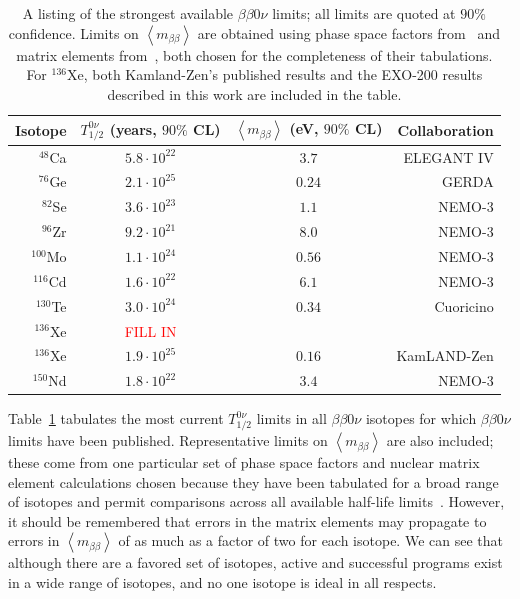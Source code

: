 \begin{table}
\begin{center}
\begin{tabular}{|rccr|}
\hline Isotope & $T_{1/2}^{0\nu}$ (years, $90\%$ CL) & $\left<m_{\beta\beta}\right>$ (eV, $90\%$ CL) & Collaboration \\ \hline
$^{48}$Ca & $5.8 \cdot 10^{22}$ & $3.7$ & ELEGANT IV \cite{ElegantIV}\\
$^{76}$Ge & $2.1 \cdot 10^{25}$ & $0.24$ & GERDA \cite{PhysRevLett.111.122503} \\
$^{82}$Se & $3.6 \cdot 10^{23}$ & $1.1$ & NEMO-3 \cite{NEMO2011RandomOtherIsotopes}\\
$^{96}$Zr & $9.2 \cdot 10^{21}$ & $8.0$ & NEMO-3 \cite{Argyriades2010168}\\
$^{100}$Mo & $1.1 \cdot 10^{24}$ & $0.56$ & NEMO-3 \cite{NEMO3-2013-100Mo}\\
$^{116}$Cd & $1.6 \cdot 10^{22}$ & $6.1$ & NEMO-3 \cite{NEMO2011RandomOtherIsotopes}\\
$^{130}$Te & $3.0 \cdot 10^{24}$ & $0.34$ & Cuoricino \cite{PhysRevC.78.035502}\\
$^{136}$Xe & \textcolor{red}{FILL IN} & & \\
$^{136}$Xe & $1.9 \cdot 10^{25}$ & $0.16$ & KamLAND-Zen \cite{PhysRevLett.110.062502}\\
$^{150}$Nd & $1.8 \cdot 10^{22}$ & $3.4$ & NEMO-3 \cite{PhysRevC.80.032501}\\
\hline
\end{tabular}
\end{center}
\caption{A listing of the strongest available $\beta\beta 0\nu$ limits; all limits are quoted at $90\%$ confidence.  Limits on $\left<m_{\beta\beta}\right>$ are obtained using phase space factors from~\cite{PhysRevC.85.034316} and matrix elements from~\cite{PhysRevLett.109.042501}, both chosen for the completeness of their tabulations.  For $^{136}$Xe, both Kamland-Zen's published results and the EXO-200 results described in this work are included in the table.}
\label{tab:0nubb_limits}
\end{table}

Table~\ref{tab:0nubb_limits} tabulates the most current $T_{1/2}^{0\nu}$ limits in all $\beta\beta 0\nu$ isotopes for which $\beta\beta 0\nu$ limits have been published.  Representative limits on $\left< m_{\beta\beta}\right>$ are also included; these come from one particular set of phase space factors and nuclear matrix element calculations chosen because they have been tabulated for a broad range of isotopes and permit comparisons across all available half-life limits~\cite{PhysRevC.85.034316,PhysRevLett.109.042501}.  However, it should be remembered that errors in the matrix elements may propagate to errors in $\left< m_{\beta\beta}\right>$ of as much as a factor of two for each isotope.  We can see that although there are a favored set of isotopes, active and successful programs exist in a wide range of isotopes, and no one isotope is ideal in all respects.

